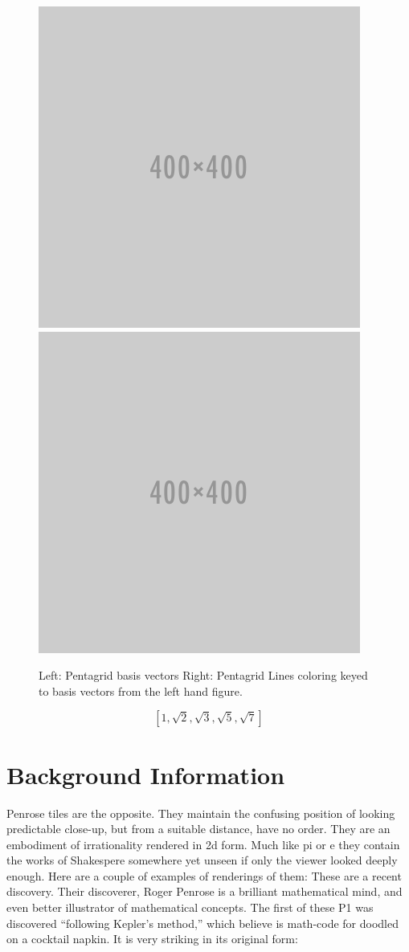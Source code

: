\documentclass{amsart}
\begin{document}
\begin{figure}[h]
  \centering
  \includegraphics[width=0.4\linewidth]{figures/placeholder}
  \includegraphics[width=0.4\linewidth]{figures/placeholder}
  \caption{Left: Pentagrid basis vectors  Right: Pentagrid Lines coloring keyed to basis vectors from the left hand figure.}
  \label{fig:pentagrid-basis}
\end{figure}



\begin{equation}
 \left[1, \sqrt{2}, \sqrt{3}, \sqrt{5}, \sqrt{7}\right]
 \label{eq:punt}
\end{equation}


\section{Background Information}

Penrose tiles are the opposite. They maintain the confusing position of looking predictable close-up, but 
from a suitable distance, have no order. They are an embodiment of irrationality rendered in 2d form. 
Much like pi or e they contain the works of Shakespere somewhere yet unseen if only the viewer looked deeply enough. Here are a couple of 
examples of renderings of them:
These are a recent discovery. Their discoverer, Roger Penrose is a brilliant mathematical mind, and 
even better illustrator of mathematical concepts. The first of these P1 was discovered “following Kepler’s method,”
which believe is math-code for doodled on a cocktail napkin. It is very striking in its original form:
\end{document}
